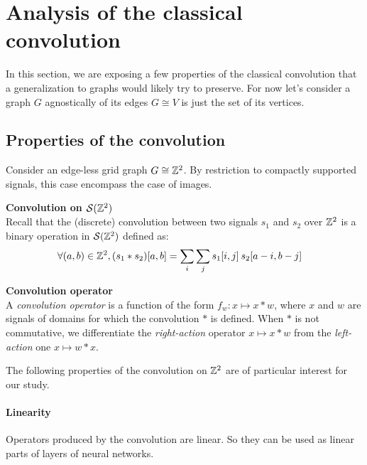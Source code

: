 \section{Analysis of the classical convolution}
\label{sec:2.1}

In this section, we are exposing a few properties of the classical convolution that a generalization to graphs would likely try to preserve. For now let's consider a graph $G$ agnostically of its edges \ie $G \cong V$ is just the set of its vertices.

\subsection{Properties of the convolution}

Consider an edge-less grid graph \ie $G \cong \bbz^2$. By restriction to compactly supported signals, this case encompass the case of images.

\begin{definition}\textbf{Convolution on $\cs(\bbz^2)$}\\
Recall that the (discrete) convolution between two signals $s_1$ and $s_2$ over $\bbz^2$ is a binary operation in $\cs(\bbz^2)$ defined as:
\begin{align*}
\forall (a,b) \in \bbz^2, (s_1 \ast s_2) [a,b] & = \displaystyle \sum_i \sum_j s_1[i,j] \h{2} s_2[a-i, b-j]
\end{align*}
\label{def:conv}
\end{definition}

\begin{definition}\textbf{Convolution operator}\\
A \emph{convolution operator} is a function of the form $f_w: x \mapsto x \ast w$, where $x$ and $w$ are signals of domains for which the convolution $\ast$ is defined. When $\ast$ is not commutative, we differentiate the \emph{right-action} operator $x \mapsto x \ast w$ from the \emph{left-action} one $x \mapsto w \ast x$.
\end{definition}

The following properties of the convolution on $\bbz^2$ are of particular interest for our study.

\paragraph{Linearity}
Operators produced by the convolution are linear. So they can be used as linear parts of layers of neural networks.

